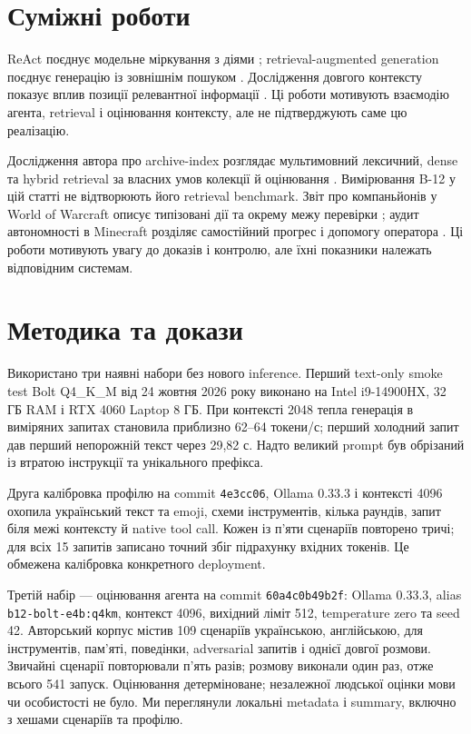 \documentclass[11pt]{article}
\begin{document}
\section{Суміжні роботи}
ReAct поєднує модельне міркування з діями \cite{react}; retrieval-augmented generation поєднує генерацію із зовнішнім пошуком \cite{rag}. Дослідження довгого контексту показує вплив позиції релевантної інформації \cite{lost}. Ці роботи мотивують взаємодію агента, retrieval і оцінювання контексту, але не підтверджують саме цю реалізацію.

Дослідження автора про archive-index розглядає мультимовний лексичний, dense та hybrid retrieval за власних умов колекції й оцінювання \cite{archive}. Вимірювання B-12 у цій статті не відтворюють його retrieval benchmark. Звіт про компаньйонів у World of Warcraft описує типізовані дії та окрему межу перевірки \cite{wow}; аудит автономності в Minecraft розділяє самостійний прогрес і допомогу оператора \cite{minecraft}. Ці роботи мотивують увагу до доказів і контролю, але їхні показники належать відповідним системам.
\section{Методика та докази}
Використано три наявні набори без нового inference. Перший text-only smoke test Bolt Q4\_K\_M від 24 жовтня 2026 року виконано на Intel i9-14900HX, 32 ГБ RAM і RTX 4060 Laptop 8 ГБ. При контексті 2048 тепла генерація в виміряних запитах становила приблизно 62--64 токени/с; перший холодний запит дав перший непорожній текст через 29,82 с. Надто великий prompt був обрізаний із втратою інструкції та унікального префікса.

Друга калібровка профілю на commit \texttt{4e3cc06}, Ollama 0.33.3 і контексті 4096 охопила український текст та emoji, схеми інструментів, кілька раундів, запит біля межі контексту й native tool call. Кожен із п'яти сценаріїв повторено тричі; для всіх 15 запитів записано точний збіг підрахунку вхідних токенів. Це обмежена калібровка конкретного deployment.

Третій набір --- оцінювання агента на commit \texttt{60a4c0b49b2f}: Ollama 0.33.3, alias \texttt{b12-bolt-e4b:q4km}, контекст 4096, вихідний ліміт 512, temperature zero та seed 42. Авторський корпус містив 109 сценаріїв українською, англійською, для інструментів, пам'яті, поведінки, adversarial запитів і однієї довгої розмови. Звичайні сценарії повторювали п'ять разів; розмову виконали один раз, отже всього 541 запуск. Оцінювання детерміноване; незалежної людської оцінки мови чи особистості не було. Ми переглянули локальні metadata і summary, включно з хешами сценаріїв та профілю.
\end{document}
